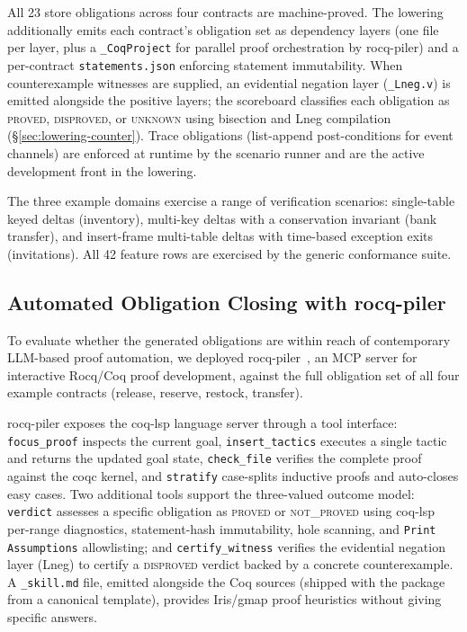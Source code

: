 \documentclass[11pt,a4paper]{article}
\begin{document}
All 23 store obligations across four contracts are machine-proved.
The lowering additionally emits each contract's obligation set as
dependency layers (one file per layer, plus a \texttt{\_CoqProject}
for parallel proof orchestration by rocq-piler) and a per-contract
\texttt{statements.json} enforcing statement immutability.  When
counterexample witnesses are supplied, an evidential negation layer
(\texttt{\_Lneg.v}) is emitted alongside the positive layers; the
scoreboard classifies each obligation as \textsc{proved},
\textsc{disproved}, or \textsc{unknown} using bisection and Lneg
compilation (§\ref{sec:lowering-counter}).  Trace obligations
(list-append post-conditions for event channels) are enforced at
runtime by the scenario runner and are the active development front in
the lowering.

The three example domains exercise a range of verification scenarios:
single-table keyed deltas (inventory), multi-key deltas with a
conservation invariant (bank transfer), and insert-frame multi-table
deltas with time-based exception exits (invitations).  All 42 feature
rows are exercised by the generic conformance suite.

\subsection{Automated Obligation Closing with \textsf{rocq-piler}}

To evaluate whether the generated obligations are within reach of
contemporary LLM-based proof automation, we deployed
\textsf{rocq-piler}~\cite{rocq-piler}, an MCP server for interactive
Rocq/Coq proof development, against the full obligation set of all
four example contracts (release, reserve, restock, transfer).

\textsf{rocq-piler} exposes the \textsf{coq-lsp} language server
through a tool interface: \texttt{focus\_proof} inspects the current
goal, \texttt{insert\_tactics} executes a single tactic and returns the
updated goal state, \texttt{check\_file} verifies the complete proof
against the coqc kernel, and \texttt{stratify} case-splits inductive
proofs and auto-closes easy cases.  Two additional tools support the
three-valued outcome model: \texttt{verdict} assesses a specific
obligation as \textsc{proved} or \textsc{not\_proved} using coq-lsp
per-range diagnostics, statement-hash immutability, hole scanning, and
\texttt{Print Assumptions} allowlisting; and
\texttt{certify\_witness} verifies the evidential negation layer (Lneg)
to certify a \textsc{disproved} verdict backed by a concrete
counterexample.  A \texttt{\_skill.md}
file, emitted alongside the Coq sources (shipped with the package
from a canonical template), provides Iris/gmap proof
heuristics without giving specific answers.
\end{document}
